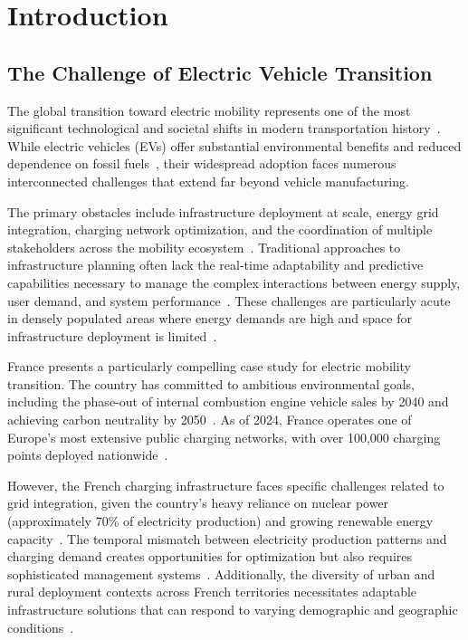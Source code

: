 \chapter{Introduction}\label{chap1}

\section{The Challenge of Electric Vehicle Transition}

The global transition toward electric mobility represents one of the most significant technological and societal shifts in modern transportation history~\cite{iea2023global}. While electric vehicles (EVs) offer substantial environmental benefits and reduced dependence on fossil fuels~\cite{knobloch2020net}, their widespread adoption faces numerous interconnected challenges that extend far beyond vehicle manufacturing.

The primary obstacles include infrastructure deployment at scale, energy grid integration, charging network optimization, and the coordination of multiple stakeholders across the mobility ecosystem~\cite{tu2019extreme,zhang2018pev}. Traditional approaches to infrastructure planning often lack the real-time adaptability and predictive capabilities necessary to manage the complex interactions between energy supply, user demand, and system performance~\cite{shareef2016review}. These challenges are particularly acute in densely populated areas where energy demands are high and space for infrastructure deployment is limited~\cite{morrissey2016future}.

France presents a particularly compelling case study for electric mobility transition. The country has committed to ambitious environmental goals, including the phase-out of internal combustion engine vehicle sales by 2040 and achieving carbon neutrality by 2050~\cite{french2020national}. As of 2024, France operates one of Europe's most extensive public charging networks, with over 100,000 charging points deployed nationwide~\cite{avere2024barometre}.

However, the French charging infrastructure faces specific challenges related to grid integration, given the country's heavy reliance on nuclear power (approximately 70\% of electricity production) and growing renewable energy capacity~\cite{rte2023electricity}. The temporal mismatch between electricity production patterns and charging demand creates opportunities for optimization but also requires sophisticated management systems~\cite{lefloch2019optimal}. Additionally, the diversity of urban and rural deployment contexts across French territories necessitates adaptable infrastructure solutions that can respond to varying demographic and geographic conditions~\cite{funke2019how}.

